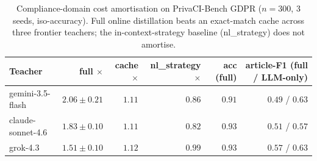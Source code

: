 \begin{table}[t]\centering
\caption{Compliance-domain cost amortisation on PrivaCI-Bench GDPR ($n{=}300$, 3 seeds, iso-accuracy). Full online distillation beats an exact-match cache across three frontier teachers; the in-context-strategy baseline (nl\_strategy) does not amortise.}
\label{tab:privaci}
\begin{tabular}{lrrrrr}
\toprule
Teacher & full $\times$ & cache $\times$ & nl\_strategy $\times$ & acc (full) & article-F1 (full / LLM-only) \\
\midrule
gemini-3.5-flash & $2.06\pm0.21$ & $1.11$ & $0.86$ & $0.91$ & $0.49$ / $0.63$ \\
claude-sonnet-4.6 & $1.83\pm0.10$ & $1.11$ & $0.82$ & $0.93$ & $0.51$ / $0.57$ \\
grok-4.3 & $1.51\pm0.10$ & $1.12$ & $0.99$ & $0.93$ & $0.57$ / $0.63$ \\
\bottomrule
\end{tabular}
\end{table}
